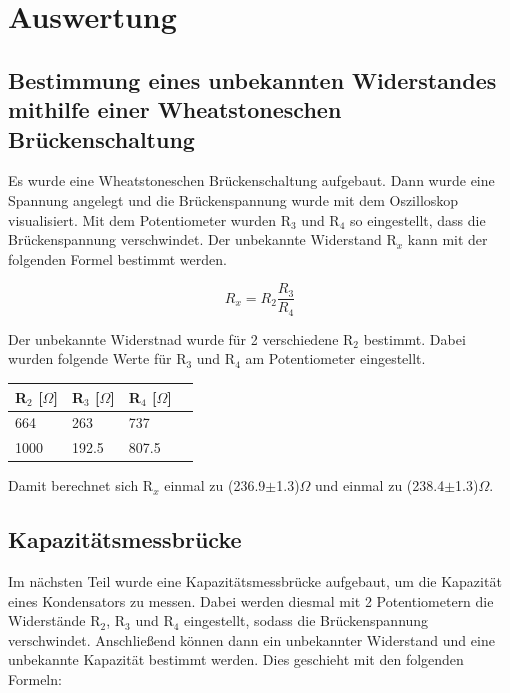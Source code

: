 \section{Auswertung}

\subsection{Bestimmung eines unbekannten Widerstandes mithilfe einer Wheatstoneschen Brückenschaltung}

Es wurde eine Wheatstoneschen Brückenschaltung aufgebaut. Dann wurde eine Spannung angelegt und die Brückenspannung wurde mit dem Oszilloskop visualisiert. Mit dem Potentiometer wurden R$_3$ und R$_4$ so eingestellt, dass die Brückenspannung verschwindet. Der unbekannte Widerstand R$_x$ kann mit der folgenden Formel bestimmt werden.

\begin{displaymath}
    R_x = R_2 \frac{R_3}{R_4}
\end{displaymath}

Der unbekannte Widerstnad wurde für 2 verschiedene R$_2$ bestimmt. Dabei wurden folgende Werte für R$_3$ und R$_4$ am Potentiometer eingestellt.

\begin{minipage}{\linewidth}
    \begin{table}[H]
        \centering
    \begin{tabular}{llll}
        \toprule
        R$_2$ [$\Omega$]  & R$_3$ [$\Omega$] &  R$_4$ [$\Omega$]   \\
        \midrule
        664 & 263 & 737 \\
        1000 & 192.5 & 807.5 \\
        \bottomrule   
    \end{tabular}
\end{table}
\end{minipage}

Damit berechnet sich R$_x$ einmal zu (236.9$\pm$1.3)$\Omega$ und einmal zu (238.4$\pm$1.3)$\Omega$.

\subsection{Kapazitätsmessbrücke}

Im nächsten Teil wurde eine Kapazitätsmessbrücke aufgebaut, um die Kapazität eines Kondensators zu messen. Dabei werden diesmal mit 2 Potentiometern die Widerstände R$_2$, R$_3$ und R$_4$ eingestellt, sodass die Brückenspannung verschwindet. Anschließend können dann ein unbekannter Widerstand und eine unbekannte Kapazität bestimmt werden. Dies geschieht mit den folgenden Formeln:

